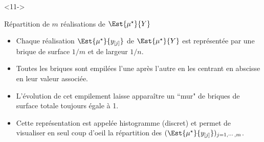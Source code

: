\documentclass[11pt]{beamer}
\newcommand{\Sim}{{\star}}
\begin{document}
\begin{frame}
\begin{onlyenv}
\begin{columns}
\end{columns}  
\end{onlyenv}

\begin{onlyenv}<11->
\begin{exampleblock}{Répartition de $m$ réalisations de $\Est{\mu^\Sim}{Y}$}
\begin{itemize}
\item<11-| alert@11> Chaque réalisation $\Est{\mu^\Sim}{y_{[j]}}$ de $\Est{\mu^\Sim}{Y}$ est représentée par une brique de surface $1/m$ et de largeur $1/n$.
\item<12-| alert@12> Toutes les briques sont empilées l'une après l'autre en les centrant en abscisse en leur valeur associée.
\item<13-| alert@13> L'évolution de cet empilement laisse apparaître un ``mur" de briques de surface totale toujours égale à 1. 
\item <14-| alert@14> Cette représentation est appelée histogramme (discret) et permet de visualiser en seul coup d'oeil la répartition des $(\Est{\mu^\Sim}{y_{[j]}})_{j=1,\cdots,m}$.
\end{itemize}
\hyperlink{aep<5>}{} \hyperlink{recap<1>}{}
\end{exampleblock}
\end{onlyenv}
\end{frame}
\end{document}
